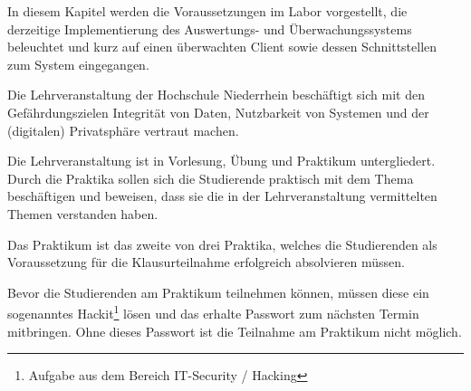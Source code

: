 \label{chap_text:Analyse}
In diesem Kapitel werden die Voraussetzungen im Labor vorgestellt, die derzeitige Implementierung des Auswertungs- und Überwachungssystems beleuchtet und kurz auf einen überwachten Client sowie dessen Schnittstellen zum System eingegangen.

Die Lehrveranstaltung  der Hochschule Niederrhein beschäftigt sich mit den Gefährdungszielen Integrität von Daten, Nutzbarkeit von Systemen und der (digitalen) Privatsphäre vertraut machen.\cite{quadeWasSieSchon2019}

Die Lehrveranstaltung ist in Vorlesung, Übung und Praktikum untergliedert. Durch die Praktika sollen sich die Studierende praktisch mit dem Thema beschäftigen und beweisen, dass sie die in der Lehrveranstaltung vermittelten Themen verstanden haben.

Das Praktikum  ist das zweite von drei Praktika, welches die Studierenden als Voraussetzung für die Klausurteilnahme erfolgreich absolvieren müssen.

Bevor die Studierenden am Praktikum teilnehmen können, müssen diese ein sogenanntes Hackit\footnote{Aufgabe aus dem Bereich IT-Security / Hacking} lösen und das erhalte Passwort zum nächsten Termin mitbringen. Ohne dieses Passwort ist die Teilnahme am Praktikum nicht möglich.

